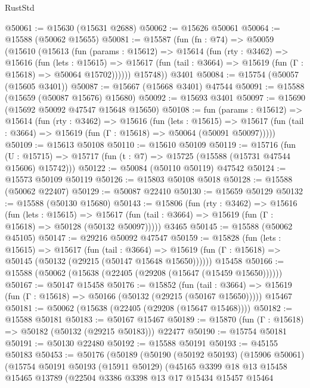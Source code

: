 \begin{lexlean}{RustStd}
\begin{coremodule}
@50061 := @15630 (@15631 @2688)
@50062 := @15626 @50061
@50064 := @15588 (@50062 @15655)
@50081 := @15587
    (fun (fn : @74) =>
    @50059
      (@15610
        (@15613
          (fun (params : @15612) =>
          @15614
            (fun (rty : @3462) =>
            @15616
              (fun (lets : @15615) =>
              @15617 (fun (tail : @3664) => @15619 (fun (Γ : @15618) => @50064 @15702))))))
        @15748))
    @3401
@50084 := @15754 (@50057 (@15605 @3401))
@50087 := @15667 (@15668 @3401) @47544
@50091 := @15588 (@15659 (@50087 @15676) @15680)
@50092 := @15693 @3401
@50097 := @15690 (@15692 @50092 @47547 @15648 @15650)
@50108 := fun (params : @15612) =>
  @15614
    (fun (rty : @3462) =>
    @15616
      (fun (lets : @15615) =>
      @15617 (fun (tail : @3664) => @15619 (fun (Γ : @15618) => @50064 (@50091 @50097)))))
@50109 := @15613 @50108
@50110 := @15610 @50109
@50119 := @15716
    (fun (U : @15715) => @15717 (fun (t : @7) => @15725 (@15588 (@15731 @47544 @15606) @15742)))
@50122 := @50084 (@50110 @50119) @47542
@50124 := @15573 @50109 @50119
@50126 := @15803 @50108 @5018
@50128 := @15588 (@50062 @22407)
@50129 := @50087 @22410
@50130 := @15659 @50129
@50132 := @15588 (@50130 @15680)
@50143 := @15806
    (fun (rty : @3462) =>
    @15616
      (fun (lets : @15615) =>
      @15617 (fun (tail : @3664) => @15619 (fun (Γ : @15618) => @50128 (@50132 @50097)))))
    @3465
@50145 := @15588 (@50062 @45105)
@50147 := @29216 @50092 @47547
@50159 := @15828
    (fun (lets : @15615) =>
    @15617
      (fun (tail : @3664) =>
      @15619 (fun (Γ : @15618) => @50145 (@50132 (@29215 (@50147 @15648 @15650))))))
    @15458
@50166 := @15588 (@50062 (@15638 (@22405 (@29208 (@15647 (@15459 @15650))))))
@50167 := @50147 @15458
@50176 := @15852
    (fun (tail : @3664) => @15619 (fun (Γ : @15618) => @50166 (@50132 (@29215 (@50167 @15650)))))
    @15467
@50181 := @50062 (@15638 (@22405 (@29208 (@15647 @15468))))
@50182 := @15588 @50181
@50183 := @50167 @15467
@50189 := @15870 (fun (Γ : @15618) => @50182 (@50132 (@29215 @50183))) @22477
@50190 := @15754 @50181
@50191 := @50130 @22480
@50192 := @15588 @50191
@50193 := @45155 @50183
@50453 := @50176
    (@50189
      (@50190
        (@50192 @50193)
        (@15906 @50061)
        (@15754
          @50191
          @50193
          (@15911 @50129)
          (@45165
            @3399
            @18
            @13
            @15458
            @15465
            @13789
            (@22504
              @3386
              @3398
              @13
              @17
              @15434
              @15457
              @15464

\end{coremodule}
\end{lexlean}
